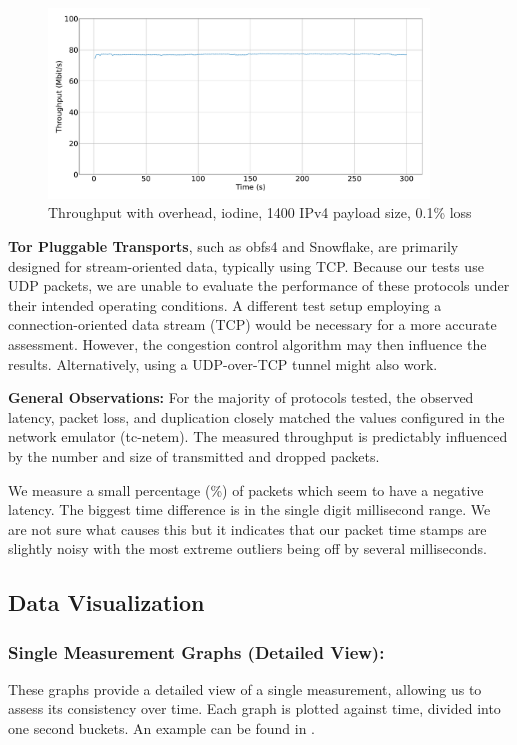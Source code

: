 \begin{figure}[tbh]
	\centering
	\includegraphics[draft=false,width=0.9\textwidth]{figures/Graphs/graph-5-iodine-constant-throughput/throughput.pdf}
	\caption{Throughput with overhead, iodine, 1400 IPv4 payload size, 0.1\% loss}
	\label{fig:graph-5-iodine-constant-throughput}
\end{figure}


\textbf{Tor Pluggable Transports}, such as obfs4 and Snowflake, are primarily designed for stream-oriented data, typically using TCP.
Because our tests use UDP packets, we are unable to evaluate the performance of these protocols under their intended operating conditions.
A different test setup employing a connection-oriented data stream (TCP) would be necessary for a more accurate assessment.
However, the congestion control algorithm may then influence the results.
Alternatively, using a UDP-over-TCP tunnel might also work.


\noindent\textbf{General Observations:}
For the majority of protocols tested, the observed latency, packet loss, and duplication closely matched the values configured in the network emulator (tc-netem).
The measured throughput is predictably influenced by the number and size of transmitted and dropped packets.

We measure a small percentage (\%) of packets which seem to have a negative latency.
The biggest time difference is in the single digit millisecond range.
We are not sure what causes this but it indicates that our packet time stamps are slightly noisy with the most extreme outliers being off by several milliseconds.


\subsection{Data Visualization}
\subsubsection{Single Measurement Graphs (Detailed View):}
\label{sect:graphs-single}
These graphs provide a detailed view of a single measurement, allowing us to assess its consistency over time.
Each graph is plotted against time, divided into one second buckets.
An example can be found in .

